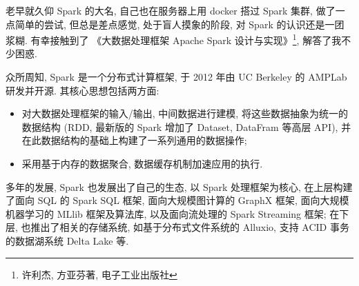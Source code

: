 老早就久仰 Spark 的大名, 自己也在服务器上用 docker 搭过 Spark 集群, 做了一点简单的尝试, 但总是差点感觉, 处于盲人摸象的阶段, 对 Spark 的认识还是一团浆糊. 有幸接触到了 《大数据处理框架 Apache Spark 设计与实现》\footnote{许利杰, 方亚芬著, 电子工业出版社}, 解答了我不少困惑. 

众所周知, Spark 是一个分布式计算框架, 于 2012 年由 UC Berkeley 的 AMPLab 研发并开源. 其核心思想包括两方面: 
\begin{itemize}
	\item 对大数据处理框架的输入/输出, 中间数据进行建模, 将这些数据抽象为统一的数据结构 (RDD, 最新版的 Spark 增加了 Dataset, DataFram 等高层 API), 并在此数据结构的基础上构建了一系列通用的数据操作;
	
	\item 采用基于内存的数据聚合, 数据缓存机制加速应用的执行.
\end{itemize}

多年的发展, Spark 也发展出了自己的生态, 以 Spark 处理框架为核心, 在上层构建了面向 SQL 的 Spark SQL 框架, 面向大规模图计算的 GraphX 框架, 面向大规模机器学习的 MLlib 框架及算法库, 以及面向流处理的 Spark Streaming 框架; 在下层,  也推出了相关的存储系统, 如基于分布式文件系统的 Alluxio, 支持 ACID 事务的数据湖系统 Delta Lake 等. 